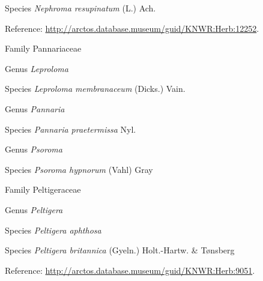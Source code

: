 \documentclass[9pt, article]{memoir}
\begin{document}
\begin{multicols}{2}
\vspace{6pt}\noindent\hspace{36pt}Species \textit{Nephroma resupinatum} (L.) Ach.


\vspace{6pt}Reference: 
\url{http://arctos.database.museum/guid/KNWR:Herb:12252}.

\vspace{6pt}\noindent\hspace{24pt}Family Pannariaceae


\vspace{6pt}\noindent\hspace{30pt}Genus \textit{Leproloma}


\vspace{6pt}\noindent\hspace{36pt}Species \textit{Leproloma membranaceum} (Dicks.) Vain.


\vspace{6pt}\noindent\hspace{30pt}Genus \textit{Pannaria}


\vspace{6pt}\noindent\hspace{36pt}Species \textit{Pannaria praetermissa} Nyl.


\vspace{6pt}\noindent\hspace{30pt}Genus \textit{Psoroma}


\vspace{6pt}\noindent\hspace{36pt}Species \textit{Psoroma hypnorum} (Vahl) Gray


\vspace{6pt}\noindent\hspace{24pt}Family Peltigeraceae


\vspace{6pt}\noindent\hspace{30pt}Genus \textit{Peltigera}


\vspace{6pt}\noindent\hspace{36pt}Species \textit{Peltigera aphthosa}


\vspace{6pt}\noindent\hspace{36pt}Species \textit{Peltigera britannica} (Gyeln.) Holt.-Hartw. \& Tønsberg


\vspace{6pt}Reference: 
\url{http://arctos.database.museum/guid/KNWR:Herb:9051}.


\end{multicols}
\end{document}
